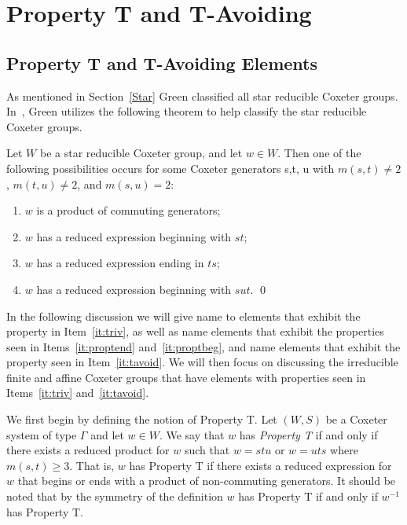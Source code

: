 \chapter{Property T and T-Avoiding}

\section{Property T and T-Avoiding Elements}\label{Tavoid}

As mentioned in Section~\ref{Star} Green classified all star reducible Coxeter groups. In~\cite{Green2006a}, Green utilizes the following theorem to help classify the star reducible Coxeter groups. 
\begin{theorem}
	Let $W$ be a star reducible Coxeter group, and let $w \in W$. Then one of the following possibilities occurs for some Coxeter generators s,t, u with $m(s,t) \neq 2$, $m(t,u) \neq 2$, and $m(s,u)=2$:
	\begin{enumerate}
	\item $w$ is a product of commuting generators;\label{it:triv}
	\item $w$ has a reduced expression beginning with $st$;\label{it:proptend}
	\item $w$ has a reduced expression ending in $ts$;\label{it:proptbeg}
	\item $w$ has a reduced expression beginning with $sut$.\label{it:tavoid}	\qed
	\end{enumerate}
\end{theorem}

In the following discussion we will give name to elements that exhibit the property in Item~\ref{it:triv}, as well as name elements that exhibit the properties seen in Items~\ref{it:proptend} and~\ref{it:proptbeg}, and name elements that exhibit the property seen in Item~\ref{it:tavoid}. We will then focus on discussing the irreducible finite and affine Coxeter groups that have elements with properties seen in Items~\ref{it:triv} and~\ref{it:tavoid}.

We first begin by defining the notion of Property T. Let $(W,S)$ be a Coxeter system of type $\Gamma$ and let $w \in W$. We say that $w$ has \emph{Property T} if and only if there exists a reduced product for $w$ such that $w=stu$ or $w=uts$ where $m(s,t)\geq 3$. That is, $w$ has Property T if there exists a reduced expression for $w$ that begins or ends with a product of non-commuting generators. It should be noted that by the symmetry of the definition $w$ has Property T if and only if $w^{-1}$ has Property T.

